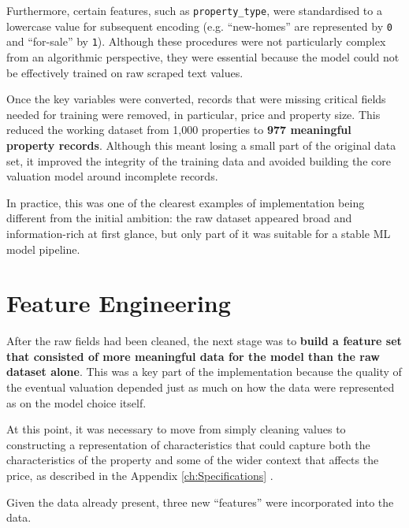 Furthermore, certain features, such as \texttt{property\_type}, were standardised to a lowercase value for subsequent encoding (e.g. ``new-homes'' are represented by \texttt{0} and ``for-sale'' by \texttt{1}). Although these procedures were not particularly complex from an algorithmic perspective, they were essential because the model could not be effectively trained on raw scraped text values.

Once the key variables were converted, records that were missing critical fields needed for training were removed, in particular, price and property size. This reduced the working dataset from 1,000 properties to \textbf{977 meaningful property records}. Although this meant losing a small part of the original data set, it improved the integrity of the training data and avoided building the core valuation model around incomplete records. 

In practice, this was one of the clearest examples of implementation being different from the initial ambition: the raw dataset appeared broad and information-rich at first glance, but only part of it was suitable for a stable ML model pipeline.


\section{Feature Engineering}

After the raw fields had been cleaned, the next stage was to \textbf{build a feature set that consisted of more meaningful data for the model than the raw dataset alone}. This was a key part of the implementation because the quality of the eventual valuation depended just as much on how the data were represented as on the model choice itself. 

At this point, it was necessary to move from simply cleaning values to constructing a representation of characteristics that could capture both the characteristics of the property and some of the wider context that affects the price, as described in the Appendix \ref{ch:Specifications} .

Given the data already present, three new ``features'' were incorporated into the data.

